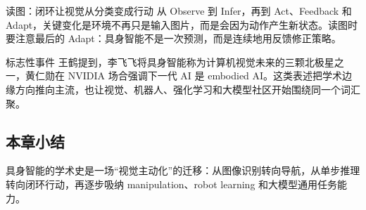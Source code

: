 \begin{knowledgebox}{读图：闭环让视觉从分类变成行动}
从 Observe 到 Infer，再到 Act、Feedback 和 Adapt，关键变化是环境不再只是输入图片，而是会因为动作产生新状态。读图时要注意最后的 Adapt：具身智能不是一次预测，而是连续地用反馈修正策略。
\end{knowledgebox}

\begin{importantbox}{标志性事件}
王鹤提到，李飞飞将具身智能称为计算机视觉未来的三颗北极星之一，黄仁勋在 NVIDIA 场合强调下一代 AI 是 embodied AI。这类表述把学术边缘方向推向主流，也让视觉、机器人、强化学习和大模型社区开始围绕同一个词汇聚。
\end{importantbox}

\subsection{本章小结}

具身智能的学术史是一场“视觉主动化”的迁移：从图像识别转向导航，从单步推理转向闭环行动，再逐步吸纳 manipulation、robot learning 和大模型通用任务能力。

